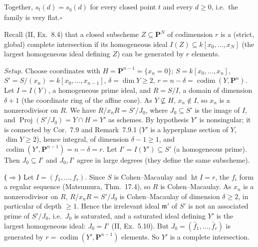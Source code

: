 \documentclass[11pt]{article}
\begin{document}
Together, $s_t(d)=s_\eta(d)$ for every closed point $t$ and every $d\ge0$, i.e.\ the family is very flat.\hfill$\square$

\pf
Recall (II, Ex.~8.4) that a closed subscheme $Z\subseteq\mathbf P^N$ of codimension $r$ is a (strict, global) complete intersection if its homogeneous ideal $I(Z)\subseteq k[x_0,\dots,x_N]$ (the largest homogeneous ideal defining $Z$) can be generated by $r$ elements.

\emph{Setup.} Choose coordinates with $H=\mathbf P^{n-1}=\{x_n=0\}$; $S=k[x_0,\dots,x_n]$, $S'=S/(x_n)=k[x_0,\dots,x_{n-1}]$, $\delta=\dim Y\ge2$, $r=n-\delta=\operatorname{codim}(Y,\mathbf P^n)$. Let $I=I(Y)$, a homogeneous prime ideal, and $R=S/I$, a domain of dimension $\delta+1$ (the coordinate ring of the affine cone). As $Y\not\subseteq H$, $x_n\notin I$, so $x_n$ is a nonzerodivisor on $R$. We have $R/x_nR=S'/J_0$, where $J_0\subseteq S'$ is the image of $I$, and $\operatorname{Proj}(S'/J_0)=Y\cap H=Y'$ as schemes. By hypothesis $Y'$ is nonsingular; it is connected by Cor.~7.9 and Remark~7.9.1 ($Y'$ is a hyperplane section of $Y$, $\dim Y\ge2$), hence integral, of dimension $\delta-1\ge1$, and $\operatorname{codim}(Y',\mathbf P^{n-1})=n-\delta=r$. Let $I'=I(Y')\subseteq S'$ (a homogeneous prime). Then $J_0\subseteq I'$ and $J_0,I'$ agree in large degrees (they define the same subscheme).

\textbf{($\Rightarrow$)} Let $I=(f_1,\dots,f_r)$. Since $S$ is Cohen--Macaulay and $\operatorname{ht}I=r$, the $f_i$ form a regular sequence (Matsumura, Thm.~17.4), so $R$ is Cohen--Macaulay. As $x_n$ is a nonzerodivisor on $R$, $R/x_nR=S'/J_0$ is Cohen--Macaulay of dimension $\delta\ge2$, in particular of depth $\ge1$. Hence the irrelevant ideal $\mathfrak m'$ of $S'$ is not an associated prime of $S'/J_0$, i.e.\ $J_0$ is saturated, and a saturated ideal defining $Y'$ is the largest homogeneous ideal: $J_0=I'$ (II, Ex.~5.10). But $J_0=(\bar f_1,\dots,\bar f_r)$ is generated by $r=\operatorname{codim}(Y',\mathbf P^{n-1})$ elements. So $Y'$ is a complete intersection.
\end{document}
